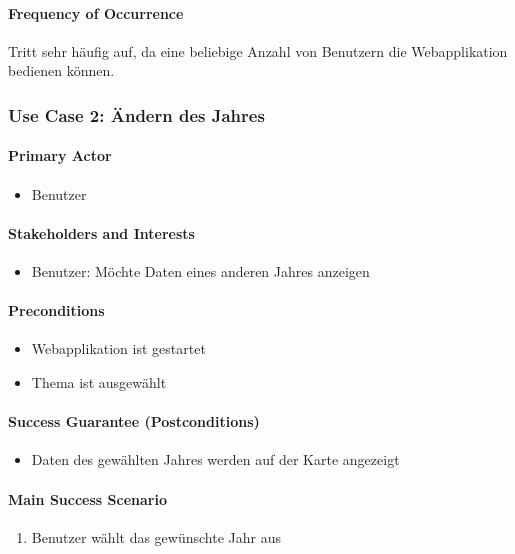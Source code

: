 \paragraph{Frequency of Occurrence}
Tritt sehr häufig auf, da eine beliebige Anzahl von Benutzern die Webapplikation bedienen können.

\subsubsection{Use Case 2: Ändern des Jahres}
\paragraph{Primary Actor}
\begin{itemize}
\item Benutzer
\end{itemize}

\paragraph{Stakeholders and Interests}
\begin{itemize}
\item Benutzer: Möchte Daten eines anderen Jahres anzeigen
\end{itemize}

\paragraph{Preconditions}
\begin{itemize}
\item Webapplikation ist gestartet
\item Thema ist ausgewählt
\end{itemize}

\paragraph{Success Guarantee (Postconditions)}
\begin{itemize}
\item Daten des gewählten Jahres werden auf der Karte angezeigt
\end{itemize}

\paragraph{Main Success Scenario}
\begin{enumerate}
\item Benutzer wählt das gewünschte Jahr aus
\end{enumerate}

